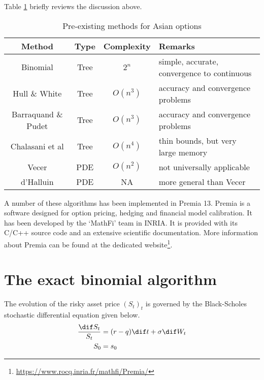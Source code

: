 Table \ref{tab:asian-literature-review} briefly reviews the discussion above.
\begin{table}[h]
	\centering
	\caption{Pre-existing methods for Asian options}
	\label{tab:asian-literature-review}
	\begin{tabular}{cccl}
		\toprule
		Method  &  Type  &  Complexity  &  Remarks  \\
		\midrule
		Binomial  &  Tree  &  $ 2^n $  &  simple, accurate, convergence to continuous  \\
		Hull \& White  &  Tree  &  $ O(n^3) $  &  accuracy and convergence problems  \\
		Barraquand \& Pudet  &  Tree  &  $ O(n^3) $  &  accuracy and convergence problems  \\
		Chalasani et al  &  Tree  &  $ O(n^4) $  &  thin bounds, but very large memory  \\
		Vecer  &  PDE  &  $ O(n^2) $  &  not universally applicable  \\
		d'Halluin  &  PDE  &  NA  &  more general than Vecer \\
		\bottomrule
	\end{tabular}
\end{table}


A number of these algorithms has been implemented in Premia 13. Premia is a software designed for option pricing, hedging and financial model calibration. It has been developed by the `MathFi' team in INRIA. It is provided with its C/C++ source code and an extensive scientific documentation. More information about Premia can be found at the dedicated  website\footnote{\url{https://www.rocq.inria.fr/mathfi/Premia/}}.


\section{The exact binomial algorithm}
\label{sec:asian-binom}
The evolution of the risky asset price $ (S_t)_t $ is governed by the Black-Scholes stochastic differential equation given below.
\begin{subequations}
	\begin{align*}
		\frac{\dif S_t}{S_t}  &=  (r - q) \dif t + \sigma \dif W_t  \\
		S_0  &=  s_0
	\end{align*}
\end{subequations}

